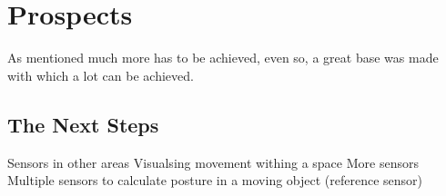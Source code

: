 \chapter*{Prospects}
\label{chap:Porspects}
\setcounter{section}{0}

As mentioned much more has to be achieved, even so, a great base was made with which a lot can be achieved. 

\section{The Next Steps}

Sensors in other areas
Visualsing movement withing a space
More sensors
Multiple sensors to calculate posture in a moving object (reference sensor)
